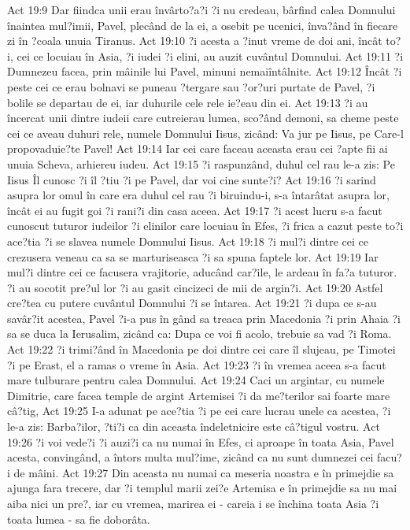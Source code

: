 Act 19:9  Dar fiindca unii erau învârto?a?i ?i nu credeau, bârfind calea Domnului înaintea mul?imii, Pavel, plecând de la ei, a osebit pe ucenici, înva?ând în fiecare zi în ?coala unuia Tiranus.
Act 19:10  ?i acesta a ?inut vreme de doi ani, încât to?i, cei ce locuiau în Asia, ?i iudei ?i elini, au auzit cuvântul Domnului.
Act 19:11  ?i Dumnezeu facea, prin mâinile lui Pavel, minuni nemaiîntâlnite.
Act 19:12  Încât ?i peste cei ce erau bolnavi se puneau ?tergare sau ?or?uri purtate de Pavel, ?i bolile se departau de ei, iar duhurile cele rele ie?eau din ei.
Act 19:13  ?i au încercat unii dintre iudeii care cutreierau lumea, sco?ând demoni, sa cheme peste cei ce aveau duhuri rele, numele Domnului Iisus, zicând: Va jur pe Iisus, pe Care-l propovaduie?te Pavel!
Act 19:14  Iar cei care faceau aceasta erau cei ?apte fii ai unuia Scheva, arhiereu iudeu.
Act 19:15  ?i raspunzând, duhul cel rau le-a zis: Pe Iisus Îl cunosc ?i îl ?tiu ?i pe Pavel, dar voi cine sunte?i?
Act 19:16  ?i sarind asupra lor omul în care era duhul cel rau ?i biruindu-i, s-a întarâtat asupra lor, încât ei au fugit goi ?i rani?i din casa aceea.
Act 19:17  ?i acest lucru s-a facut cunoscut tuturor iudeilor ?i elinilor care locuiau în Efes, ?i frica a cazut peste to?i ace?tia ?i se slavea numele Domnului Iisus.
Act 19:18  ?i mul?i dintre cei ce crezusera veneau ca sa se marturiseasca ?i sa spuna faptele lor.
Act 19:19  Iar mul?i dintre cei ce facusera vrajitorie, aducând car?ile, le ardeau în fa?a tuturor. ?i au socotit pre?ul lor ?i au gasit cincizeci de mii de argin?i.
Act 19:20  Astfel cre?tea cu putere cuvântul Domnului ?i se întarea.
Act 19:21  ?i dupa ce s-au savâr?it acestea, Pavel ?i-a pus în gând sa treaca prin Macedonia ?i prin Ahaia ?i sa se duca la Ierusalim, zicând ca: Dupa ce voi fi acolo, trebuie sa vad ?i Roma.
Act 19:22  ?i trimi?ând în Macedonia pe doi dintre cei care îl slujeau, pe Timotei ?i pe Erast, el a ramas o vreme în Asia.
Act 19:23  ?i în vremea aceea s-a facut mare tulburare pentru calea Domnului.
Act 19:24  Caci un argintar, cu numele Dimitrie, care facea temple de argint Artemisei ?i da me?terilor sai foarte mare câ?tig,
Act 19:25  I-a adunat pe ace?tia ?i pe cei care lucrau unele ca acestea, ?i le-a zis: Barba?ilor, ?ti?i ca din aceasta îndeletnicire este câ?tigul vostru.
Act 19:26  ?i voi vede?i ?i auzi?i ca nu numai în Efes, ci aproape în toata Asia, Pavel acesta, convingând, a întors multa mul?ime, zicând ca nu sunt dumnezei cei facu?i de mâini.
Act 19:27  Din aceasta nu numai ca meseria noastra e în primejdie sa ajunga fara trecere, dar ?i templul marii zei?e Artemisa e în primejdie sa nu mai aiba nici un pre?, iar cu vremea, marirea ei - careia i se închina toata Asia ?i toata lumea - sa fie doborâta.
